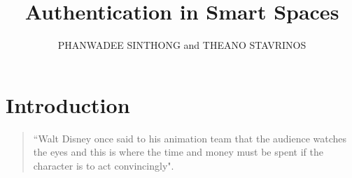 \documentclass{acmtog} %
\begin{document}
\title{Authentication in Smart Spaces} %

\author{PHANWADEE SINTHONG {\upshape and} THEANO STAVRINOS
}





\maketitle



\begin{abstract}


\end{abstract}


\section{Introduction}
 
\begin{quote}
``Walt Disney once said to his animation team that the audience watches
the eyes and this is where the time and money must be spent if the
character is to act convincingly".
\end{quote}


% 
\end{document}
